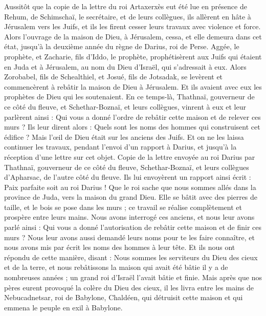 \begin{multicols}{2}
Aussitôt que la copie de la lettre du roi Artaxerxès eut été lue en présence de Rehum, de Schimschaï,  le secrétaire, et de leurs collègues, ils allèrent en hâte à Jérusalem vers les Juifs, et ils les firent cesser leurs travaux avec violence et force.
Alors l’ouvrage de la maison de Dieu, à Jérusalem, cessa, et elle demeura dans cet état, jusqu'à la deuxième année du règne de Darius, roi de Perse.
\VerseOne{}Aggée, le prophète, et Zacharie, fils d'Iddo, le prophète, prophétisèrent aux Juifs qui étaient en Juda et à Jérusalem, au nom du Dieu d'Israël, qui s’adressait à eux.
Alors Zorobabel, fils de Schealthiel, et Josué, fils de Jotsadak, se levèrent et commencèrent à rebâtir la maison de Dieu à Jérusalem. Et ils avaient avec eux les prophètes de Dieu qui les soutenaient.
En ce temps-là, Thathnaï, gouverneur de ce côté du fleuve, et Schethar-Boznaï, et leurs collègues, vinrent à eux et leur parlèrent ainsi : Qui vous a donné l’ordre de rebâtir cette maison et de relever ces murs ?
Ils leur dirent alors : Quels sont les noms des hommes qui construisent cet édifice ?
Mais l’œil de Dieu était sur les anciens des Juifs. Et on ne les laissa continuer les travaux, pendant l’envoi d’un rapport à Darius, et jusqu'à la réception d’une lettre sur cet objet.
Copie de la lettre envoyée au roi Darius par Thathnaï, gouverneur de ce côté du fleuve, Schethar-Boznaï, et leurs collègues d'Apharsac, de l’autre côté du fleuve.
Ils lui envoyèrent un rapport ainsi écrit : Paix parfaite soit au roi Darius !
Que le roi sache que nous sommes allés dans la province de Juda, vers la maison du grand Dieu. Elle se bâtit avec des pierres de taille, et le bois se pose dans les murs ; ce travail se réalise complètement et prospère entre leurs mains.
Nous avons interrogé ces anciens, et nous leur avons parlé ainsi : Qui vous a donné l'autorisation de rebâtir cette maison et de finir ces murs ?
Nous leur avons aussi demandé leurs noms pour te les faire connaître, et nous avons mis par écrit les noms des hommes à leur tête.
Et ils nous ont répondu de cette manière, disant : Nous sommes les serviteurs du Dieu des cieux et de la terre, et nous rebâtissons la maison qui avait été bâtie il y a de nombreuses années ; un grand roi d'Israël l’avait bâtie et finie.
Mais après que nos pères eurent provoqué la colère du Dieu des cieux, il les livra entre les mains de Nebucadnetsar, roi de Babylone, Chaldéen, qui détruisit cette maison et qui emmena le peuple en exil à Babylone.

\end{multicols}
